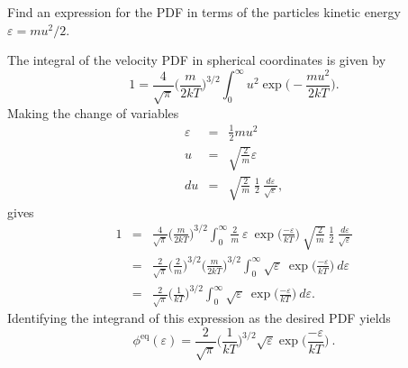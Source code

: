 
Find an expression for the PDF in terms of the particles kinetic energy $\varepsilon = m u ^2 / 2$. 

The integral of the velocity PDF in spherical coordinates is given by
\begin{equation}
1 = \frac{4}{\sqrt{\pi}} \bigg(\frac{m}{2 k T}\bigg)^{3/2} \int_{0}^{\infty} u^2 \exp\bigg(-\frac{m u^2}{2 k T}\bigg).
\end{equation}
Making the change of variables 
\begin{eqnarray*}
\varepsilon &=& \frac{1}{2} m u ^2 \\
u &=& \sqrt{\frac{2}{m}} \varepsilon \\
du &=& \sqrt{\frac{2}{m}}~\frac{1}{2}~\frac{d \varepsilon}{\sqrt{\varepsilon}},
\end{eqnarray*}
gives
\begin{eqnarray*}
1 &=& \frac{4}{\sqrt{\pi}} \bigg(\frac{m}{2 k T}\bigg)^{3/2} \int_{0}^{\infty} \frac{2}{m}~ \varepsilon~\exp\bigg(\frac{-\varepsilon}{k T}\bigg) ~ \sqrt{\frac{2}{m}}~\frac{1}{2}~\frac{d \varepsilon}{\sqrt{\varepsilon}} \\
&=& \frac{2}{\sqrt{\pi}} \bigg(\frac{2}{m}\bigg)^{3/2} \bigg(\frac{m}{2 k T}\bigg)^{3/2} \int_{0}^{\infty} \sqrt{\varepsilon} ~ \exp\bigg(\frac{-\varepsilon}{k T}\bigg)~d \varepsilon\\
&=& \frac{2}{\sqrt{\pi}} \bigg(\frac{1}{k T}\bigg)^{3/2} \int_{0}^{\infty} \sqrt{\varepsilon}~ \exp\bigg(\frac{-\varepsilon}{k T}\bigg)~d \varepsilon.
\end{eqnarray*}
Identifying the integrand of this expression as the desired PDF yields
\begin{equation}
\boxed{\phi^{\text{eq}}(\varepsilon) = \frac{2}{\sqrt{\pi}} \bigg(\frac{1}{k T}\bigg)^{3/2} \sqrt{\varepsilon} \exp\bigg(\frac{-\varepsilon}{k T}\bigg)}~.
\end{equation}